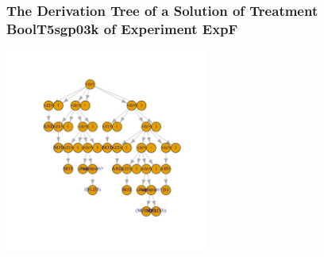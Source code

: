  \begin{frame}
 \frametitle{ The Derivation Tree of a Solution of Treatment BoolT5sgp03k of Experiment ExpF }
 \begin{center}
\includegraphics[width=0.5\textwidth, angle=0]
{ExpFDerivationTreeFigure001.pdf}
 \end{center}
 \label{report/ExpFDerivationTreeFigure001.pdf}  
 \end{frame}


